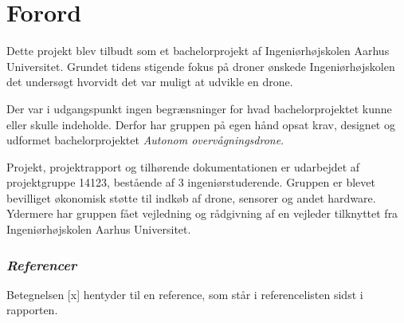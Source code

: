 \chapter{Forord}

Dette projekt blev tilbudt som et bachelorprojekt af Ingeniørhøjskolen Aarhus Universitet. Grundet tidens stigende fokus på droner ønskede Ingeniørhøjskolen det undersøgt hvorvidt det var muligt at udvikle en drone.

Der var i udgangspunkt ingen begrænsninger for hvad bachelorprojektet kunne eller skulle indeholde. Derfor har gruppen på egen hånd opsat krav, designet og udformet bachelorprojektet \textit{Autonom overvågningsdrone}.
 
Projekt, projektrapport og tilhørende dokumentationen er udarbejdet af projektgruppe 14123, bestående af 3 ingeniørstuderende. Gruppen er blevet bevilliget økonomisk støtte til indkøb af drone, sensorer og andet hardware. Ydermere har gruppen fået vejledning og rådgivning af en vejleder tilknyttet fra Ingeniørhøjskolen Aarhus Universitet.  \\


\subsection*{\textit{Referencer} \vspace{-0.3cm}}
Betegnelsen [x] hentyder til en reference, som står i referencelisten sidst i rapporten. 